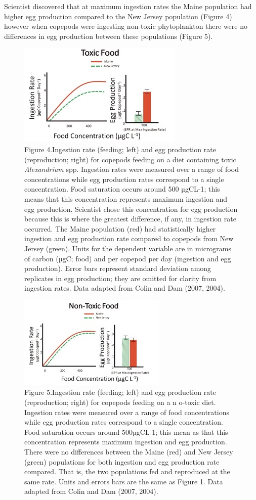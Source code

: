 \documentclass[
]{book}
\begin{document}
Scientist discovered that at maximum ingestion rates the Maine population had higher egg production compared to the New Jersey population (Figure 4) however when copepods were ingesting non-toxic phytoplankton there were no differences in egg production between these populations (Figure 5).

\begin{figure}
\centering
\includegraphics{images/figure4.png}
\caption{Figure 4.Ingestion rate (feeding; left) and egg production rate (reproduction; right) for copepods feeding on a diet containing toxic \emph{Alexandrium} spp. Ingestion rates were measured over a range of food concentrations while egg production rates correspond to a single concentration. Food saturation occurs around 500 µgCL-1; this means that this concentration represents maximum ingestion and egg production. Scientist chose this concentration for egg production because this is where the greatest difference, if any, in ingestion rate occurred. The Maine population (red) had statistically higher ingestion and egg production rate compared to copepods from New Jersey (green). Units for the dependent variable are in micrograms of carbon (µgC; food) and per copepod per day (ingestion and egg production). Error bars represent standard deviation among replicates in egg production; they are omitted for clarity from ingestion rates. Data adapted from Colin and Dam (2007, 2004).}
\end{figure}

\begin{figure}
\centering
\includegraphics{images/figure5.png}
\caption{Figure 5.Ingestion rate (feeding; left) and egg production rate (reproduction; right) for copepods feeding on a n o-toxic diet. Ingestion rates were measured over a range of food concentrations while egg production rates correspond to a single concentration. Food saturation occurs around 500µgCL-1; this mean as that this concentration represents maximum ingestion and egg production. There were no differences between the Maine (red) and New Jersey (green) populations for both ingestion and egg production rate compared. That is, the two populations fed and reproduced at the same rate. Units and errors bars are the same as Figure 1. Data adapted from Colin and Dam (2007, 2004).}
\end{figure}
\end{document}
